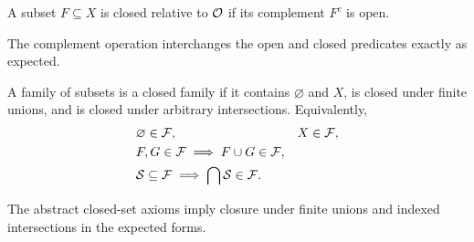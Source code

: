 \begin{definition}\label{def:closed-set}
\leanok
A subset $F \subseteq X$ is closed relative to $\mathcal{O}$ if its complement $F^c$ is open.
\end{definition}

\begin{proposition}\label{prop:closed-open-complements}
\leanok
The complement operation interchanges the open and closed predicates exactly as expected.
\end{proposition}

\begin{definition}\label{def:closed-family}
\leanok
A family of subsets is a closed family if it contains $\varnothing$ and $X$, is closed under finite unions, and is closed under arbitrary intersections.
Equivalently,
\[
\begin{aligned}
&\varnothing \in \mathcal{F},
&&X \in \mathcal{F},\\
&F,G\in\mathcal{F} \implies F\cup G\in\mathcal{F},\\
&\mathcal S\subseteq\mathcal{F} \implies \bigcap\mathcal S\in\mathcal{F}.
\end{aligned}
\]
\end{definition}

\begin{proposition}\label{prop:closed-family-helpers}
\leanok
The abstract closed-set axioms imply closure under finite unions and indexed intersections in the expected forms.
\end{proposition}

